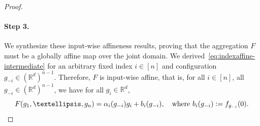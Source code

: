 \documentclass[10pt,a4paper]{amsart}
\newcommand{\R}{\mathbb{R}}
\begin{document}
\begin{proof}
    \paragraph{Step 3.} We synthesize these input-wise affineness results, proving that the aggregation $F$ must be a globally affine map over the joint domain.
    We derived~\eqref{eq:indexaffine-intermediate} for an arbitrary fixed index $i\in[n]$ and configuration $g_{-i} \in (\R^d)^{n-1}$.
    Therefore, $F$ is input-wise affine, that is, for all $i \in [n]$, all $g_{-i} \in (\R^d)^{n-1}$, we have for all $g_i \in \R^d$,
    \begin{equation}\label{eq:indexaffine}
        F(g_1, \ldots, g_n) = \alpha_i (g_{-i}) g_i + b_i(g_{-i}),
        \quad \text{where } b_i(g_{-i}) \vcentcolon= f_{g_{-i}}(0).
    \end{equation}


\end{proof}
\end{document}
